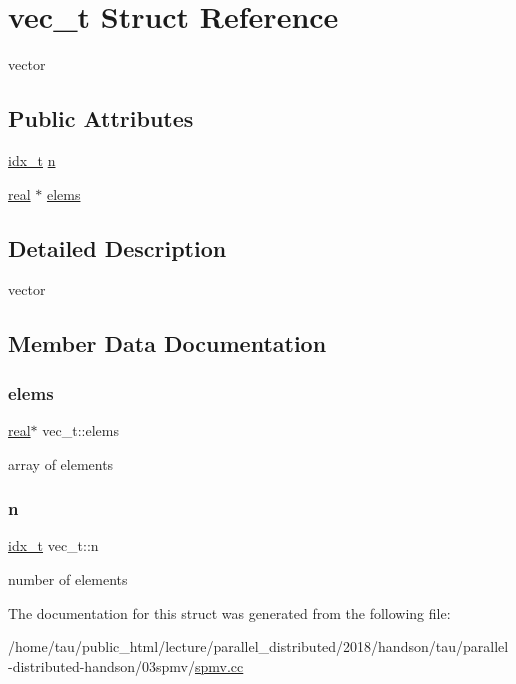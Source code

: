 \hypertarget{structvec__t}{}\section{vec\+\_\+t Struct Reference}
\label{structvec__t}


vector  


\subsection*{Public Attributes}
\begin{DoxyCompactItemize}
\item 
\hyperlink{spmv_8cc_a8e93478a00e685bea5e6a3f617bf03a3}{idx\+\_\+t} \hyperlink{structvec__t_a06879ff4054298fbc680b02e3e18da7a}{n}
\item 
\hyperlink{spmv_8cc_a11d147c64891830c9e79b3315b1b2e21}{real} $\ast$ \hyperlink{structvec__t_a7d62f0b683ab0558903c5227d670ac1a}{elems}
\end{DoxyCompactItemize}


\subsection{Detailed Description}
vector 

\subsection{Member Data Documentation}
\mbox{\label{structvec__t_a7d62f0b683ab0558903c5227d670ac1a}} 
\subsubsection{\texorpdfstring{elems}{elems}}
{\footnotesize\ttfamily \hyperlink{spmv_8cc_a11d147c64891830c9e79b3315b1b2e21}{real}$\ast$ vec\+\_\+t\+::elems}

array of elements \mbox{\label{structvec__t_a06879ff4054298fbc680b02e3e18da7a}} 
\subsubsection{\texorpdfstring{n}{n}}
{\footnotesize\ttfamily \hyperlink{spmv_8cc_a8e93478a00e685bea5e6a3f617bf03a3}{idx\+\_\+t} vec\+\_\+t\+::n}

number of elements 

The documentation for this struct was generated from the following file\+:\begin{DoxyCompactItemize}
\item 
/home/tau/public\+\_\+html/lecture/parallel\+\_\+distributed/2018/handson/tau/parallel-\/distributed-\/handson/03spmv/\hyperlink{spmv_8cc}{spmv.\+cc}\end{DoxyCompactItemize}
